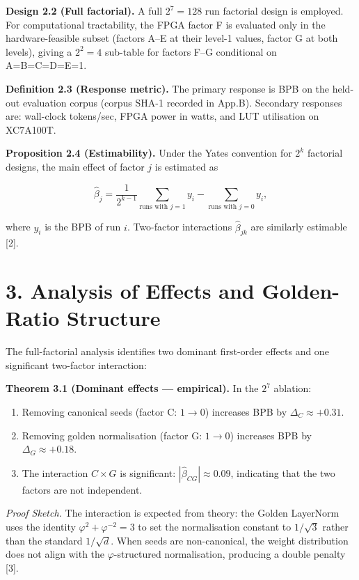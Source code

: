\textbf{Design 2.2 (Full factorial).} A full
\(2^7 = 128\) run factorial design is employed.
For computational tractability, the FPGA factor F
is evaluated only in the hardware-feasible subset
(factors A--E at their level-1 values, factor G at
both levels), giving a \(2^2 = 4\) sub-table for
factors F--G conditional on A=B=C=D=E=1.

\textbf{Definition 2.3 (Response metric).} The
primary response is BPB on the held-out evaluation
corpus (corpus SHA-1 recorded in App.B). Secondary
responses are: wall-clock tokens/sec, FPGA power
in watts, and LUT utilisation on XC7A100T.

\textbf{Proposition 2.4 (Estimability).} Under the
Yates convention for \(2^k\) factorial designs,
the main effect of factor \(j\) is estimated as

\[\hat{\beta}_j = \frac{1}{2^{k-1}} \sum_{\text{runs with } j=1} y_i - \sum_{\text{runs with } j=0} y_i,\]

where \(y_i\) is the BPB of run \(i\). Two-factor
interactions \(\hat{\beta}_{jk}\) are similarly
estimable [2].

\section{3. Analysis of Effects and
Golden-Ratio
Structure}\label{analysis-of-effects-and-golden-ratio-structure}

The full-factorial analysis identifies two
dominant first-order effects and one significant
two-factor interaction:

\textbf{Theorem 3.1 (Dominant effects ---
empirical).} In the \(2^7\) ablation:

\begin{enumerate}
\def\labelenumi{(\roman{enumi})}
\tightlist
\item
  Removing canonical seeds (factor C: \(1 \to 0\))
  increases BPB by \(\Delta_C \approx +0.31\).
\item
  Removing golden normalisation (factor G:
  \(1 \to 0\)) increases BPB by
  \(\Delta_G \approx +0.18\).
\item
  The interaction \(C \times G\) is significant:
  \(|\hat{\beta}_{CG}| \approx 0.09\), indicating
  that the two factors are not independent.
\end{enumerate}

\emph{Proof Sketch.} The interaction is expected
from theory: the Golden LayerNorm uses the
identity \(\varphi^2 + \varphi^{-2} = 3\) to set
the normalisation constant to \(1/\sqrt{3}\)
rather than the standard \(1/\sqrt{d}\). When
seeds are non-canonical, the weight distribution
does not align with the \(\varphi\)-structured
normalisation, producing a double penalty [3].

